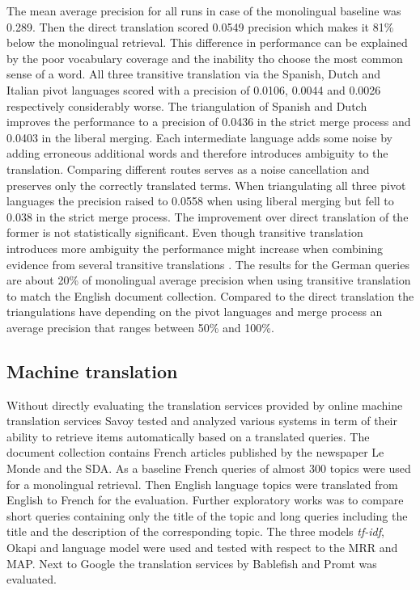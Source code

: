 \documentclass[journal]{IEEEtran}
\begin{document}
The mean average precision for all runs in case of the monolingual baseline was 0.289.
Then the direct translation scored 0.0549 precision which makes it 81\% below the monolingual retrieval.
This difference in performance can be explained by the poor vocabulary coverage and the inability tho choose the most common sense of a word.
All three transitive translation via the Spanish, Dutch and Italian pivot languages scored with a precision of 0.0106, 0.0044 and 0.0026 respectively considerably worse.
The triangulation of Spanish and Dutch improves the performance to a precision of 0.0436 in the strict merge process and 0.0403 in the liberal merging.
Each intermediate language adds some noise by adding erroneous additional words and therefore introduces ambiguity to the translation.
Comparing different routes serves as a noise cancellation and preserves only the correctly translated terms.
When triangulating all three pivot languages the precision raised to 0.0558 when using liberal merging but fell to 0.038 in the strict merge process.
The improvement over direct translation of the former is not statistically significant.
Even though transitive translation introduces more ambiguity the performance might increase when combining evidence from several transitive translations \cite{ballesteros00}.
The results for the German queries are about 20\% of monolingual average precision when using transitive translation to match the English document collection.
Compared to the direct translation the triangulations have depending on the pivot languages and merge process an average precision that ranges between 50\% and 100\%.

\subsection{Machine translation}
Without directly evaluating the translation services provided by online machine translation services Savoy \cite{savoy09} tested and analyzed various systems in term of their ability to retrieve items automatically based on a translated queries.
The document collection contains French articles published by the newspaper Le Monde and the SDA.
As a baseline French queries of almost 300 topics were used for a monolingual retrieval.
Then English language topics were translated from English to French for the evaluation.
Further exploratory works was to compare short queries containing only the title of the topic and long queries including the title and the description of the corresponding topic.
The three models \textit{tf-idf}, Okapi and language model were used and tested with respect to the MRR and MAP.
Next to Google the translation services by Bablefish and Promt was evaluated.
\end{document}
